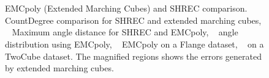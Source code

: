 \begin{figure}
	\centering
	\\
	\\
	\caption{EMCpoly (Extended Marching Cubes) and SHREC comparison.~\protect{} CountDegree comparison for SHREC and extended marching cubes, 
		~\protect{} Maximum angle distance for SHREC and EMCpoly,
		~\protect{} angle distribution using EMCpoly, 
		~\protect{} EMCpoly on a Flange dataset, ~\protect{} on a TwoCube dataset. 
The magnified regions shows the errors generated by extended marching cubes.}	
\end{figure}

